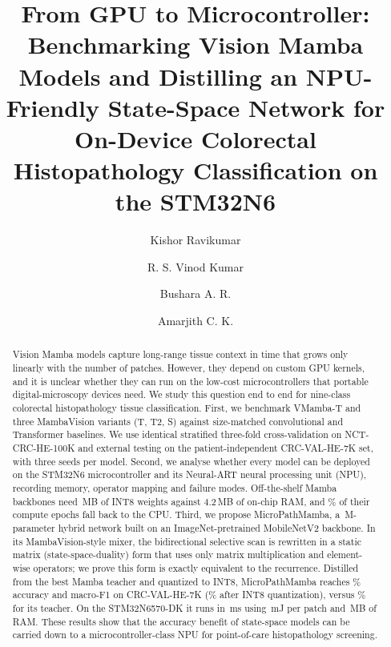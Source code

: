 \documentclass[preprint,12pt]{elsarticle}
\begin{document}
\begin{frontmatter}

\title{From GPU to Microcontroller: Benchmarking Vision Mamba Models and Distilling an NPU-Friendly State-Space Network for On-Device Colorectal Histopathology Classification on the STM32N6}

\author[nicheRS]{Kishor Ravikumar}
\author[niche]{R. S. Vinod Kumar}
\author[kmea]{Bushara A. R.}
\author[pp]{Amarjith C. K.}
\address[nicheRS]{Research Scholar, Department of Electronics and Communication Engineering, Noorul Islam Centre for Higher Education (NICHE), Kumaracoil, Nagercoil, Tamil Nadu, India}
\address[niche]{Department of Electronics and Communication Engineering, Noorul Islam Centre for Higher Education (NICHE), Kumaracoil, Nagercoil, Tamil Nadu, India}
\address[kmea]{Department of Computer Science and Engineering, KMEA Engineering College, Kochi, Kerala, India}
\address[pp]{Purchasing Power, Atlanta, Georgia, USA}

\begin{abstract}
Vision Mamba models capture long-range tissue context in time that grows only linearly with the number of patches. However, they depend on custom GPU kernels, and it is unclear whether they can run on the low-cost microcontrollers that portable digital-microscopy devices need. We study this question end to end for nine-class colorectal histopathology tissue classification.
First, we benchmark VMamba-T and three MambaVision variants (T, T2, S) against size-matched convolutional and Transformer baselines. We use identical stratified three-fold cross-validation on NCT-CRC-HE-100K and external testing on the patient-independent CRC-VAL-HE-7K set, with three seeds per model.
Second, we analyse whether every model can be deployed on the STM32N6 microcontroller and its Neural-ART neural processing unit (NPU), recording memory, operator mapping and failure modes. Off-the-shelf Mamba backbones need \resMambaWeightsMB\,MB of INT8 weights against 4.2\,MB of on-chip RAM, and \resMambaFallbackPct\% of their compute epochs fall back to the CPU.
Third, we propose MicroPathMamba, a \resStudentParams\,M-parameter hybrid network built on an ImageNet-pretrained MobileNetV2 backbone. In its MambaVision-style mixer, the bidirectional selective scan is rewritten in a static matrix (state-space-duality) form that uses only matrix multiplication and element-wise operators; we prove this form is exactly equivalent to the recurrence. Distilled from the best Mamba teacher and quantized to INT8, MicroPathMamba reaches \resStudentExtAcc\% accuracy and \resStudentExtFone{} macro-F1 on CRC-VAL-HE-7K (\resStudentIntEightAcc\% after INT8 quantization), versus \resTeacherExtAcc\% for its \resTeacherName{} teacher. On the STM32N6570-DK it runs in \resStudentLatency\,ms using \resStudentEnergy\,mJ per patch and \resStudentRAM\,MB of RAM.
These results show that the accuracy benefit of state-space models can be carried down to a microcontroller-class NPU for point-of-care histopathology screening.
\end{abstract}


\end{frontmatter}
\end{document}

